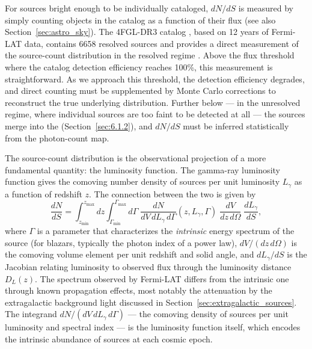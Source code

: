 For sources bright enough to be individually cataloged, $dN/dS$ is measured by simply counting objects in the catalog as a function of their flux (see also Section~\ref{sec:astro_sky}). The 4FGL-DR3 catalog \cite{Fermi-LAT:2022byn}, based on 12 years of Fermi-LAT data, contains 6658 resolved sources and provides a direct measurement of the source-count distribution in the resolved regime \cite{Amerio:2023uet}.
Above the flux threshold where the catalog detection efficiency reaches 100\%, this measurement is straightforward.
As we approach this threshold, the detection efficiency degrades, and direct counting must be supplemented by Monte Carlo corrections to reconstruct the true underlying distribution.
Further below --- in the unresolved regime, where individual sources are too faint to be detected at all --- the sources merge into the \UGRB (Section~\ref{sec:6.1.2}), and $dN/dS$ must be inferred statistically from the photon-count map.

The source-count distribution is the observational projection of a more fundamental quantity: the luminosity function.
The gamma-ray luminosity function gives the comoving number density of sources per unit luminosity $L_\gamma$ as a function of redshift $z$.
The connection between the two is given by \cite{DGRB-review}
\begin{equation}
	\frac{dN}{dS} = \int_{z_\mathrm{min}}^{z_\mathrm{max}} dz \int_{\Gamma_\mathrm{min}}^{\Gamma_\mathrm{max}} d\Gamma \; \frac{dN}{dV \, dL_\gamma \, d\Gamma}(z, L_\gamma, \Gamma) \; \frac{dV}{dz \, d\Omega} \; \frac{dL_\gamma}{dS},
	\label{eq:dnds_lf}
\end{equation}
where $\Gamma$ is a parameter that characterizes the \emph{intrinsic} energy spectrum of the source (for blazars, typically the photon index of a power law), $dV/(dz \, d\Omega)$ is the comoving volume element per unit redshift and solid angle, and $dL_\gamma/dS$ is the Jacobian relating luminosity to observed flux through the luminosity distance $D_L(z)$.
The spectrum observed by Fermi-LAT differs from the intrinsic one through known propagation effects, most notably the attenuation by the extragalactic background light discussed in Section~\ref{sec:extragalactic_sources}.
The integrand $dN/(dV \, dL_\gamma \, d\Gamma)$ --- the comoving density of sources per unit luminosity and spectral index --- is the luminosity function itself, which encodes the intrinsic abundance of sources at each cosmic epoch.

